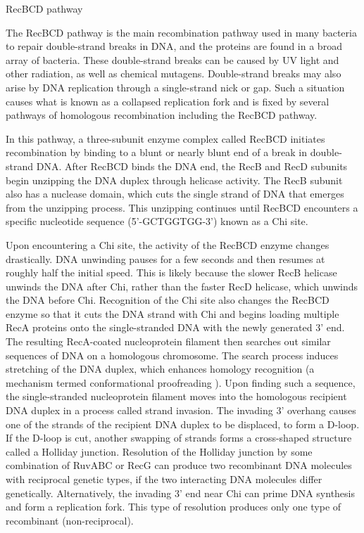 RecBCD pathway

The RecBCD pathway is the main recombination pathway used in many bacteria to repair double-strand breaks in DNA, and the proteins are found in a broad array of bacteria. These double-strand breaks can be caused by UV light and other radiation, as well as chemical mutagens. Double-strand breaks may also arise by DNA replication through a single-strand nick or gap. Such a situation causes what is known as a collapsed replication fork and is fixed by several pathways of homologous recombination including the RecBCD pathway.

In this pathway, a three-subunit enzyme complex called RecBCD initiates recombination by binding to a blunt or nearly blunt end of a break in double-strand DNA. After RecBCD binds the DNA end, the RecB and RecD subunits begin unzipping the DNA duplex through helicase activity. The RecB subunit also has a nuclease domain, which cuts the single strand of DNA that emerges from the unzipping process. This unzipping continues until RecBCD encounters a specific nucleotide sequence (5'-GCTGGTGG-3') known as a Chi site.

Upon encountering a Chi site, the activity of the RecBCD enzyme changes drastically. DNA unwinding pauses for a few seconds and then resumes at roughly half the initial speed. This is likely because the slower RecB helicase unwinds the DNA after Chi, rather than the faster RecD helicase, which unwinds the DNA before Chi. Recognition of the Chi site also changes the RecBCD enzyme so that it cuts the DNA strand with Chi and begins loading multiple RecA proteins onto the single-stranded DNA with the newly generated 3' end. The resulting RecA-coated nucleoprotein filament then searches out similar sequences of DNA on a homologous chromosome. The search process induces stretching of the DNA duplex, which enhances homology recognition (a mechanism termed conformational proofreading ). Upon finding such a sequence, the single-stranded nucleoprotein filament moves into the homologous recipient DNA duplex in a process called strand invasion. The invading 3' overhang causes one of the strands of the recipient DNA duplex to be displaced, to form a D-loop. If the D-loop is cut, another swapping of strands forms a cross-shaped structure called a Holliday junction. Resolution of the Holliday junction by some combination of RuvABC or RecG can produce two recombinant DNA molecules with reciprocal genetic types, if the two interacting DNA molecules differ genetically. Alternatively, the invading 3' end near Chi can prime DNA synthesis and form a replication fork. This type of resolution produces only one type of recombinant (non-reciprocal).

